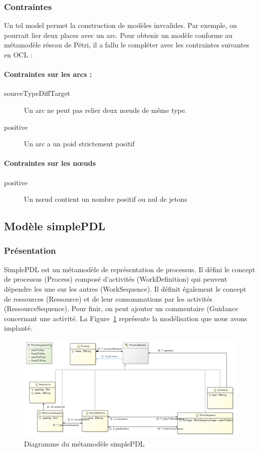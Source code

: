 \documentclass[12pt]{article}
\begin{document}
\subsubsection{Contraintes}
Un tel model permet la construction de modèles invcalides. Par exemple, on pourrait lier deux places avec un arc. Pour obtenir un modèle conforme au métamodèle réseau de Pétri, il a fallu le compléter avec les contraintes suivantes en OCL :
\paragraph*{Contraintes sur les arcs :}
\begin{description}
\item[sourceTypeDiffTarget] Un arc ne peut pas relier deux n\oe uds de même type.
\item[positive] Un arc a un poid strictement positif
\end{description}

\paragraph*{Contraintes sur les n\oe uds}
\begin{description}
\item[positive] Un n\oe ud contient un nombre positif ou nul de jetons
\end{description}

\subsection{Modèle simplePDL}
\subsubsection{Présentation}
SimplePDL est un métamodèle de représentation de processus. Il défini le concept de processus (\textsf{Process}) composé d'activités (\textsf{WorkDefinition}) qui peuvent dépendre les une sur les autres (\textsf{WorkSequence}). Il définit également le concept de ressources (\textsf{Ressource}) et de leur consommations par les activités (\textsf{RessourceSequence}). Pour finir, on peut ajouter un commentaire (\textsf{Guidance} concernant une activité. La Figure~\ref{fig:simplePDL} représente la modélisation que nous avons implanté.
\begin{figure}[!h]
  \centering
  \includegraphics[width=1\textwidth]{simplePDL.png}
  \caption{Diagramme du métamodèle simplePDL}\label{fig:simplePDL} 
\end{figure}
\end{document}
